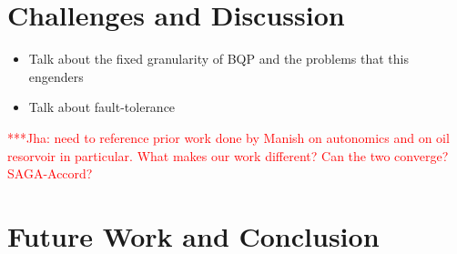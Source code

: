 \documentclass[conference,final]{IEEEtran}
\newcommand{\jha}[0]{}
\newcommand{\jhanote}[1]{ {\textcolor{red} { ***Jha: #1 }}}
\begin{document}


\section{Challenges and Discussion}

\begin{itemize}
\item Talk about the fixed granularity of BQP and the problems that this
engenders
\item Talk about fault-tolerance
\end{itemize}


\jhanote{need to reference prior work done by Manish on autonomics and
  on oil resorvoir in particular. What makes our work different?  Can
  the two converge? SAGA-Accord?}

\section{Future Work and Conclusion}
\end{document}

